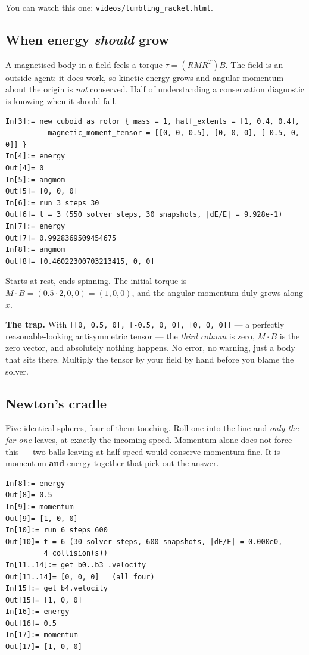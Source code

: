 \documentclass[11pt]{article}
\newcommand{\code}[1]{\texttt{#1}}
\begin{document}
You can watch this one: \code{videos/tumbling\_racket.html}.

\subsection{When energy \emph{should} grow}

A magnetised body in a field feels a torque $\tau = (RMR^{T})B$. The
field is an outside agent: it does work, so kinetic energy grows and
angular momentum about the origin is \emph{not} conserved. Half of
understanding a conservation diagnostic is knowing when it should fail.

\begin{lstlisting}
In[3]:= new cuboid as rotor { mass = 1, half_extents = [1, 0.4, 0.4],
          magnetic_moment_tensor = [[0, 0, 0.5], [0, 0, 0], [-0.5, 0, 0]] }
In[4]:= energy
Out[4]= 0
In[5]:= angmom
Out[5]= [0, 0, 0]
In[6]:= run 3 steps 30
Out[6]= t = 3 (550 solver steps, 30 snapshots, |dE/E| = 9.928e-1)
In[7]:= energy
Out[7]= 0.9928369509454675
In[8]:= angmom
Out[8]= [0.46022300703213415, 0, 0]
\end{lstlisting}

Starts at rest, ends spinning. The initial torque is
$M\!\cdot\!B = (0.5\cdot2, 0, 0) = (1,0,0)$, and the angular momentum
duly grows along $x$.

\textbf{The trap.} With
\code{[[0, 0.5, 0], [-0.5, 0, 0], [0, 0, 0]]} --- a perfectly
reasonable-looking antisymmetric tensor --- the \emph{third column} is
zero, $M\!\cdot\!B$ is the zero vector, and absolutely nothing happens.
No error, no warning, just a body that sits there. Multiply the tensor
by your field by hand before you blame the solver.

\subsection{Newton's cradle}

Five identical spheres, four of them touching. Roll one into the line
and \emph{only the far one} leaves, at exactly the incoming speed.
Momentum alone does not force this --- two balls leaving at half speed
would conserve momentum fine. It is momentum \textbf{and} energy
together that pick out the answer.

\begin{lstlisting}
In[8]:= energy
Out[8]= 0.5
In[9]:= momentum
Out[9]= [1, 0, 0]
In[10]:= run 6 steps 600
Out[10]= t = 6 (30 solver steps, 600 snapshots, |dE/E| = 0.000e0,
         4 collision(s))
In[11..14]:= get b0..b3 .velocity
Out[11..14]= [0, 0, 0]   (all four)
In[15]:= get b4.velocity
Out[15]= [1, 0, 0]
In[16]:= energy
Out[16]= 0.5
In[17]:= momentum
Out[17]= [1, 0, 0]
\end{lstlisting}
\end{document}
